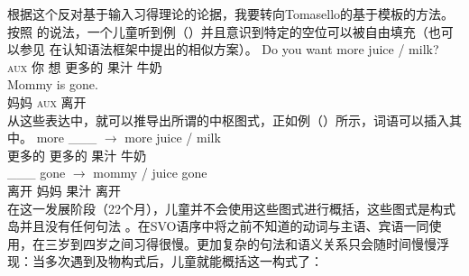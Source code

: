 根据这个反对基于输入习得理论的论据，我要转向Tomasello的基于模板的方法\indexcxgstartc。按照 \citet[Section~4.2.1]{Tomasello2003a}的说法，一个儿童听到例（）并且意识到特定的空位可以被自由填充（也可以参见 在认知语法框架中提出的相似方案）。
\eal
\ex 
\gll Do you want more juice / milk?\\
     \textsc{aux} 你 想 更多的 果汁 {} 牛奶\\
\ex 
\gll Mommy is gone.\\
    妈妈 \textsc{aux} 离开\\
\zl
从这些表达中，就可以推导出所谓的中枢图式，正如例（）所示，词语可以插入其中。
\eal
\ex 
\gll  more \_\_\_ $\to$ more juice / milk\\
     更多的 {} {} 更多的 果汁 {} 牛奶\\
\ex 
\gll  \_\_\_ gone $\to$ mommy / juice gone\\
     {} 离开 {} 妈妈 {} 果汁 离开\\
\zl
在这一发展阶段（22个月），儿童并不会使用这些图式进行概括，这些图式是构式岛并且没有任何句法 \citep{TADR97a}。在SVO语序中将之前不知道的动词与主语、宾语一同使用，在三岁到四岁之间习得很慢\citep[--129]{Tomasello2003a}。更加复杂的句法和语义关系只会随时间慢慢浮现：当多次遇到及物构式后，儿童就能概括这一构式了：
